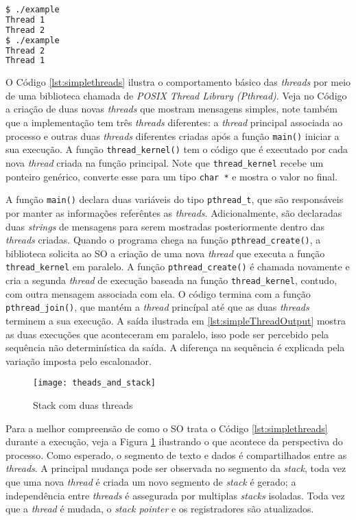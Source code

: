 \begin{lstlisting}[frame=single,
                   language=bash,
                   caption={Saída do exemplo de threads},
                   label={lst:simpleThreadOutput}]
$ ./example 
Thread 1 
Thread 2
$ ./example
Thread 2 
Thread 1
\end{lstlisting}

O Código \ref{lst:simplethreads} ilustra o comportamento básico das
\emph{threads} por meio de uma biblioteca chamada de \emph{POSIX Thread Library
(Pthread)}. Veja no Código a criação de duas novas \emph{threads} que mostram
mensagens simples, note também que a implementação tem três \emph{threads}
diferentes: a \emph{thread} principal associada ao processo e outras duas
\emph{threads} diferentes criadas após a função \texttt{main()} iniciar a sua
execução. A função \texttt{thread\_kernel()} tem o código que é executado por
cada nova \emph{thread} criada na função principal. Note que
\texttt{thread\_kernel} recebe um ponteiro genérico, converte esse para um tipo
\texttt{char *} e mostra o valor no final.

A função \texttt{main()} declara duas variáveis do tipo \texttt{pthread\_t}, que
são responsáveis por manter as informações referêntes as \emph{threads}.
Adicionalmente, são declaradas duas \emph{strings} de mensagens para serem
mostradas posteriormente dentro das \emph{threads} criadas. Quando o programa
chega na função \texttt{pthread\_create()}, a biblioteca solicita ao SO a
criação de uma nova \emph{thread} que executa a função \texttt{thread\_kernel}
em paralelo. A função \texttt{pthread\_create()} é chamada novamente e cria a segunda
\emph{thread} de execução baseada na função \texttt{thread\_kernel}, contudo,
com outra mensagem associada com ela. O código termina com a função
\texttt{pthread\_join()}, que mantém a \emph{thread} princípal até que as duas
\emph{threads} terminem a sua execução. A saída ilustrada em
\ref{lst:simpleThreadOutput} mostra as duas execuções que aconteceram em
paralelo, isso pode ser percebido pela sequência não determinística da saída. A
diferença na sequência é explicada pela variação imposta pelo escalonador.

\begin{figure}[!h]
  \centering
  \texttt{[image: theads\_and\_stack]} 
  \caption{Stack com duas threads}
  \label{fig:stack_threads} 
\end{figure}

Para a melhor compreensão de como o SO trata o Código \ref{lst:simplethreads}
durante a execução, veja a Figura \ref{fig:stack_threads} ilustrando o que
acontece da perspectiva do processo. Como esperado, o segmento de texto e dados
é compartilhados entre as \emph{threads}. A principal mudança pode ser
observada no segmento da \emph{stack}, toda vez que uma nova \emph{thread} é
criada um novo segmento de \emph{stack} é gerado; a independência entre
\emph{threads} é assegurada por multiplas \emph{stacks} isoladas. Toda vez que
a \emph{thread} é mudada, o \emph{stack pointer} e os registradores são
atualizados.

